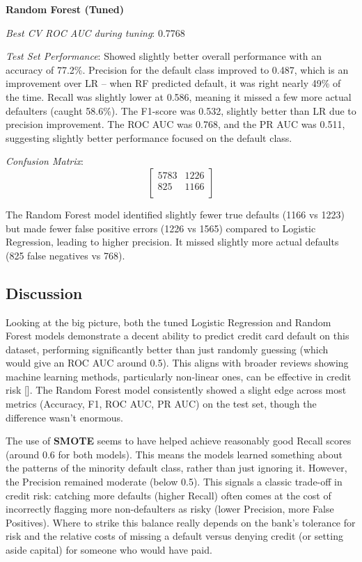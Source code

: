 \documentclass[a4paper,12pt]{article}
\begin{document}
\textbf{Random Forest (Tuned)}

\textit{Best CV ROC AUC during tuning}: 0.7768

\textit{Test Set Performance}: Showed slightly better overall performance with an accuracy of 77.2\%. Precision for the default class improved to 0.487, which is an improvement over LR – when RF predicted default, it was right nearly 49\% of the time. Recall was slightly lower at 0.586, meaning it missed a few more actual defaulters (caught 58.6\%). The F1-score was 0.532, slightly better than LR due to precision improvement. The ROC AUC was 0.768, and the PR AUC was 0.511, suggesting slightly better performance focused on the default class.

\textit{Confusion Matrix}:
\[
\begin{bmatrix}
5783 & 1226 \\
825 & 1166 \\
\end{bmatrix}
\]

The Random Forest model identified slightly fewer true defaults (1166 vs 1223) but made fewer false positive errors (1226 vs 1565) compared to Logistic Regression, leading to higher precision. It missed slightly more actual defaults (825 false negatives vs 768).

\subsection{Discussion}

Looking at the big picture, both the tuned Logistic Regression and Random Forest models demonstrate a decent ability to predict credit card default on this dataset, performing significantly better than just randomly guessing (which would give an ROC AUC around 0.5). This aligns with broader reviews showing machine learning methods, particularly non-linear ones, can be effective in credit risk [\cite{liu2022systemic}]. The Random Forest model consistently showed a slight edge across most metrics (Accuracy, F1, ROC AUC, PR AUC) on the test set, though the difference wasn't enormous.

The use of \textbf{SMOTE} seems to have helped achieve reasonably good Recall scores (around 0.6 for both models). This means the models learned something about the patterns of the minority default class, rather than just ignoring it. However, the Precision remained moderate (below 0.5). This signals a classic trade-off in credit risk: catching more defaults (higher Recall) often comes at the cost of incorrectly flagging more non-defaulters as risky (lower Precision, more False Positives). Where to strike this balance really depends on the bank's tolerance for risk and the relative costs of missing a default versus denying credit (or setting aside capital) for someone who would have paid. 
\end{document}
